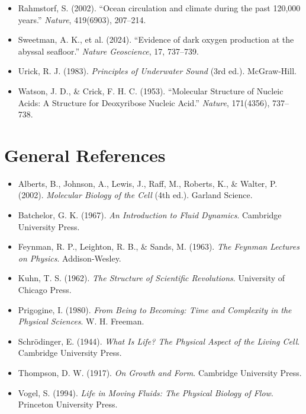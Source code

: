 \documentclass[11pt, letterpaper, openany]{book}
\begin{document}
\begin{itemize}
    \item Rahmstorf, S. (2002). “Ocean circulation and climate during the past 120,000 years.” \textit{Nature}, 419(6903), 207–214.

    \item Sweetman, A. K., et al. (2024). “Evidence of dark oxygen production at the abyssal seafloor.” \textit{Nature Geoscience}, 17, 737–739.

    \item Urick, R. J. (1983). \textit{Principles of Underwater Sound} (3rd ed.). McGraw-Hill.

    \item Watson, J. D., \& Crick, F. H. C. (1953). “Molecular Structure of Nucleic Acids: A Structure for Deoxyribose Nucleic Acid.” \textit{Nature}, 171(4356), 737–738.

\end{itemize}

\section*{General References}

\begin{itemize}

    \item Alberts, B., Johnson, A., Lewis, J., Raff, M., Roberts, K., \& Walter, P. (2002). \textit{Molecular Biology of the Cell} (4th ed.). Garland Science.

    \item Batchelor, G. K. (1967). \textit{An Introduction to Fluid Dynamics}. Cambridge University Press.

    \item Feynman, R. P., Leighton, R. B., \& Sands, M. (1963). \textit{The Feynman Lectures on Physics}. Addison-Wesley.

    \item Kuhn, T. S. (1962). \textit{The Structure of Scientific Revolutions}. University of Chicago Press.

    \item Prigogine, I. (1980). \textit{From Being to Becoming: Time and Complexity in the Physical Sciences}. W. H. Freeman.

    \item Schrödinger, E. (1944). \textit{What Is Life? The Physical Aspect of the Living Cell}. Cambridge University Press.

    \item Thompson, D. W. (1917). \textit{On Growth and Form}. Cambridge University Press.

    \item Vogel, S. (1994). \textit{Life in Moving Fluids: The Physical Biology of Flow}. Princeton University Press.

\end{itemize}
\end{document}
